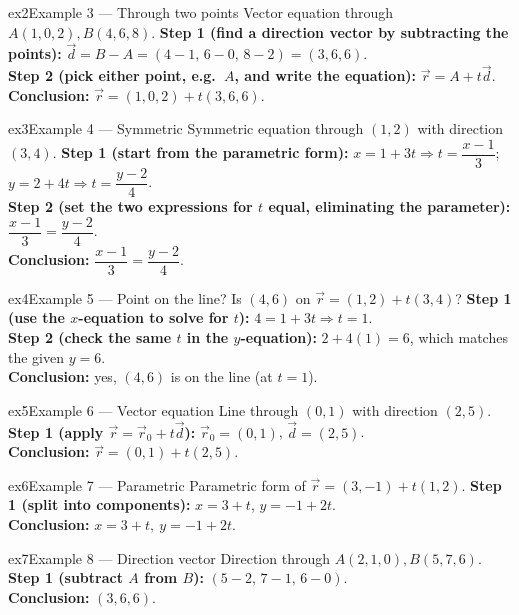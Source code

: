 \documentclass[11pt]{article}
\begin{document}
\begin{example}{ex2}{Example 3 --- Through two points}
Vector equation through $A(1,0,2),B(4,6,8)$.\soln
\textbf{Step 1 (find a direction vector by subtracting the points):} $\vec d=B-A=(4-1,\,6-0,\,8-2)=(3,6,6)$.\\[3pt]
\textbf{Step 2 (pick either point, e.g.\ $A$, and write the equation):} $\vec r=A+t\vec d$.\\[3pt]
\textbf{Conclusion:} $\vec r=(1,0,2)+t(3,6,6)$.
\end{example}

\begin{example}{ex3}{Example 4 --- Symmetric}
Symmetric equation through $(1,2)$ with direction $(3,4)$.\soln
\textbf{Step 1 (start from the parametric form):} $x=1+3t\Rightarrow t=\dfrac{x-1}3$; $y=2+4t\Rightarrow t=\dfrac{y-2}4$.\\[3pt]
\textbf{Step 2 (set the two expressions for $t$ equal, eliminating the parameter):} $\dfrac{x-1}3=\dfrac{y-2}4$.\\[3pt]
\textbf{Conclusion:} $\dfrac{x-1}{3}=\dfrac{y-2}{4}$.
\end{example}

\begin{example}{ex4}{Example 5 --- Point on the line?}
Is $(4,6)$ on $\vec r=(1,2)+t(3,4)$?\soln
\textbf{Step 1 (use the $x$-equation to solve for $t$):} $4=1+3t\Rightarrow t=1$.\\[3pt]
\textbf{Step 2 (check the same $t$ in the $y$-equation):} $2+4(1)=6$, which matches the given $y=6$.\\[3pt]
\textbf{Conclusion:} yes, $(4,6)$ is on the line (at $t=1$).
\end{example}

\begin{example}{ex5}{Example 6 --- Vector equation}
Line through $(0,1)$ with direction $(2,5)$.\soln
\textbf{Step 1 (apply $\vec r=\vec r_0+t\vec d$):} $\vec r_0=(0,1)$, $\vec d=(2,5)$.\\[3pt]
\textbf{Conclusion:} $\vec r=(0,1)+t(2,5)$.
\end{example}

\begin{example}{ex6}{Example 7 --- Parametric}
Parametric form of $\vec r=(3,-1)+t(1,2)$.\soln
\textbf{Step 1 (split into components):} $x=3+t$, $y=-1+2t$.\\[3pt]
\textbf{Conclusion:} $x=3+t,\ y=-1+2t$.
\end{example}

\begin{example}{ex7}{Example 8 --- Direction vector}
Direction through $A(2,1,0),B(5,7,6)$.\soln
\textbf{Step 1 (subtract $A$ from $B$):} $(5-2,\,7-1,\,6-0)$.\\[3pt]
\textbf{Conclusion:} $(3,6,6)$.
\end{example}
\end{document}
